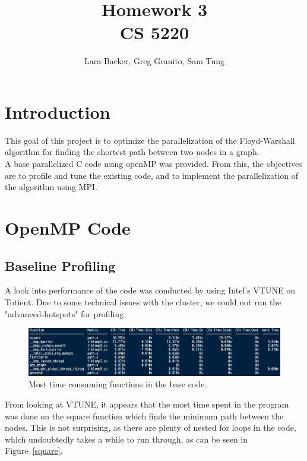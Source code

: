 \documentclass{article}
\begin{document}
\title{Homework 3 \\CS 5220}
\author{Lara Backer, Greg Granito, Sam Tung}

\maketitle

\section{Introduction}

This goal of this project is to optimize the parallelization of the Floyd-Warshall algorithm for finding the shortest path between two nodes in a graph. \\

A base parallelized C code using openMP was provided. From this, the objectives are to profile and tune the existing code, and to implement the parallelization of the algorithm using MPI.  

\section{OpenMP Code}

\subsection{Baseline Profiling}
A look into performance of the code was conducted by using Intel's VTUNE on Totient. Due to some technical issues with the cluster, we could not run the "advanced-hotspots" for profiling. 

	\begin{figure}[h!]
		\begin{center}
			\includegraphics[width=0.7\columnwidth]{amplxe}
			\caption{Most time consuming functions in the base code.}
			\label{amplxe}
		\end{center}
	\end{figure}
	
From looking at VTUNE, it appears that the most time spent in the program was done on the square function which finds the minimum path between the nodes. This is not surprising, as there are plenty of nested for loops in the code, which undoubtedly takes a while to run through, as can be seen in Figure~\ref{square}.
\end{document}
